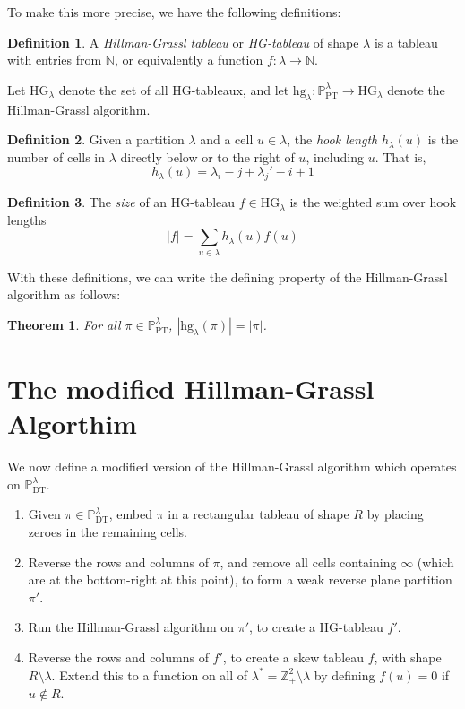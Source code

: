 \documentclass{amsart}
\newcommand{\pt}[1]{\mathbb{P}_\mathrm{PT}^{#1}}
\newcommand{\dt}[1]{\mathbb{P}_\mathrm{DT}^{#1}}
\newcommand{\ZZ}{\mathbb{Z}}
\newcommand{\NN}{\mathbb{N}}
\newcommand{\HG}[1]{\mathrm{HG}_{#1}}
\newcommand{\hg}[1]{\mathrm{hg}_{#1}}
\newtheorem{theorem}{Theorem}
\theoremstyle{definition}
\newtheorem{definition}{Definition}
\begin{document}
To make this more precise, we have the following definitions:
\begin{definition}
  A \emph{Hillman-Grassl tableau} or \emph{HG-tableau} of shape
  $\lambda$ is a tableau with entries from $\NN$, or equivalently a
  function $f : \lambda \to \NN$.

  Let $\HG{\lambda}$ denote the set of all HG-tableaux, and let
  $\hg{\lambda} : \pt{\lambda} \to \HG{\lambda}$ denote the
  Hillman-Grassl algorithm.
\end{definition}
\begin{definition}
  Given a partition $\lambda$ and a cell $u \in \lambda$, the
  \emph{hook length} $h_\lambda(u)$ is the number of cells in $\lambda$
  directly below or to the right of $u$, including $u$.  That is,
  \[
    h_\lambda(u) = \lambda_i - j + \lambda_j' - i + 1
  \]
\end{definition}
\begin{definition}
  The \emph{size} of an HG-tableau $f \in \HG{\lambda}$ is the
  weighted sum over hook lengths
  \[
    |f| = \sum_{u \in \lambda} h_\lambda(u) f(u)
  \]
\end{definition}
With these definitions, we can write the defining property of the
Hillman-Grassl algorithm as follows:
\begin{theorem}
  For all $\pi \in \pt{\lambda}$, $|\hg{\lambda}(\pi)| = |\pi|$.
\end{theorem}

\section{The modified Hillman-Grassl Algorthim}

We now define a modified version of the Hillman-Grassl algorithm which
operates on $\dt{\lambda}$.
\begin{enumerate}
\item Given $\pi \in \dt{\lambda}$, embed $\pi$ in a rectangular
  tableau of shape $R$ by placing zeroes in the remaining cells.
\item Reverse the rows and columns of $\pi$, and remove all
  cells containing $\infty$ (which are at the bottom-right at this
  point), to form a weak reverse plane partition $\pi'$.
\item Run the Hillman-Grassl algorithm on $\pi'$, to create a
  HG-tableau $f'$.
\item Reverse the rows and columns of $f'$, to create a skew tableau
  $f$, with shape $R \setminus \lambda$.  Extend this to a function
  on all of $\lambda^* = \ZZ_+^2 \setminus \lambda$ by defining $f(u)
  = 0$ if $u \notin R$.
\end{enumerate}
\end{document}
